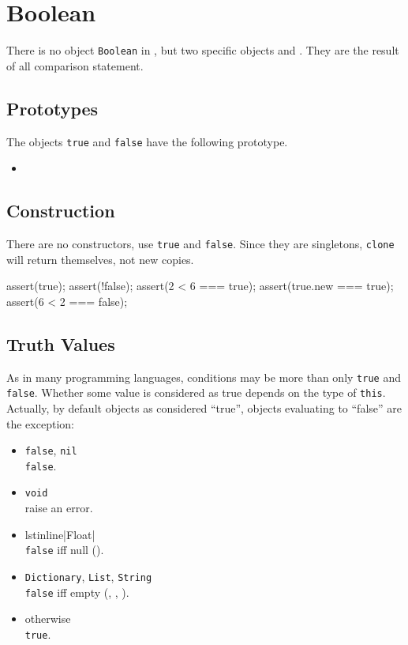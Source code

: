 \section{Boolean}

There is no object \lstinline|Boolean| in \us, but two specific
objects  and .  They are the result of
all comparison statement.


\subsection{Prototypes}

The objects \lstinline|true| and \lstinline|false| have the following
prototype.

\begin{itemize}
\item {}
\end{itemize}

\subsection{Construction}

There are no constructors, use \lstinline|true| and \lstinline|false|.
Since they are singletons, \lstinline|clone| will return themselves,
not new copies.

\begin{urbiscript}
assert(true);
assert(!false);
assert(2 < 6 === true);
assert(true.new === true);
assert(6 < 2 === false);
\end{urbiscript}

\subsection{Truth Values}
\label{sec:truth}

As in many programming languages, conditions may be more than only
\lstinline|true| and \lstinline|false|.  Whether some value is
considered as true depends on the type of \lstinline|this|.  Actually,
by default objects as considered ``true'', objects evaluating to
``false'' are the exception:
\begin{itemize}
\item \lstinline|false|, \lstinline|nil|\\
  \lstinline|false|.
\item \lstinline|void|\\
  raise an error.
\item lstinline|Float|\\
  \lstinline|false| iff null ().
\item \lstinline|Dictionary|, \lstinline|List|,  \lstinline|String|\\
  \lstinline|false| iff empty (,
  , ).
\item otherwise\\
  \lstinline|true|.
\end{itemize}

